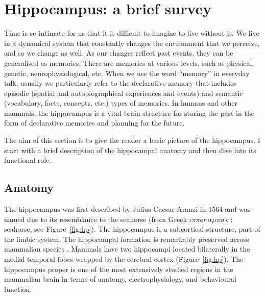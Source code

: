\section{Hippocampus: a brief survey}
\label{sec:hippo}
  Time is so intimate for us that it is difficult to imagine to live without
  it. We live in a dynamical system that constantly changes the environment
  that we perceive, and so we change as well. As our changes reflect past
  events, they can be generalised as memories. There are memories at various
  levels, such as physical, genetic, neurophysiological, etc. When we use the
  word ``memory'' in everyday talk, usually we particularly refer to the
  declarative memory that includes episodic (spatial and autobiographical
  experiences and events) and semantic (vocabulary, facts, concepts, etc.)
  types of memories.  In humans and other mammals, the hippocampus is a vital
  brain structure for storing the past in the form of declarative memories and
  planning for the future.

  The aim of this section is to give the reader a basic picture of the
  hippocampus. I start with a brief description of the hippocampal anatomy and
  then dive into its functional role.

  \subsection{Anatomy}
    The hippocampus was first described by Julius Caesar Aranzi in 1564 and was
    named due to its resemblance to the seahorse (from Greek $\iota \pi \pi o
    \kappa \alpha \mu \pi o \varsigma$: seahorse, see Figure~\ref{fig:hp}). The
    hippocampus is a subcortical structure, part of the limbic system. The
    hippocampal formation is remarkably preserved across mammalian species
    \citep{Manns2006, Clark2013}. Mammals have two hippocampi located bilaterally
    in the medial temporal lobes wrapped by the cerebral cortex
    (Figure~\ref{fig:hp}). The hippocampus proper is one of the most
    extensively studied regions in the mammalian brain in terms of anatomy,
    electrophysiology, and behavioural function.

